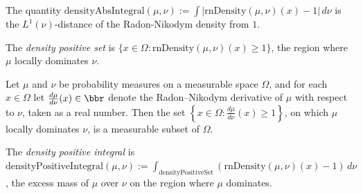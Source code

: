 \begin{definition}
\label{CommunicationComplexity.densityAbsIntegral}
\leanok
{}
The quantity $\mathrm{densityAbsIntegral}(\mu,\nu) := \int |\mathrm{rnDensity}(\mu,\nu)(x) - 1|\,d\nu$ is the $L^1(\nu)$-distance of the Radon-Nikodym density from $1$.
\end{definition}

\begin{definition}
\label{CommunicationComplexity.densityPositiveSet}
\leanok
{}
The \emph{density positive set} is $\{x \in \Omega : \mathrm{rnDensity}(\mu,\nu)(x) \ge 1\}$,
the region where $\mu$ locally dominates $\nu$.
\end{definition}

\begin{theorem}
\label{CommunicationComplexity.measurableSet_densityPositiveSet}
\leanok
{}
Let $\mu$ and $\nu$ be probability measures on a measurable space $\Omega$, and for each
$x \in \Omega$ let $\frac{d\mu}{d\nu}(x) \in \bbr$ denote the Radon–Nikodym derivative
of $\mu$ with respect to $\nu$, taken as a real number. Then the set $\left\{x \in
\Omega : \frac{d\mu}{d\nu}(x) \ge 1\right\}$, on which $\mu$ locally dominates $\nu$, is
a measurable subset of $\Omega$.
\end{theorem}

\begin{definition}
\label{CommunicationComplexity.densityPositiveIntegral}
\leanok
{}
The \emph{density positive integral} is
$\mathrm{densityPositiveIntegral}(\mu,\nu) := \int_{\mathrm{densityPositiveSet}} (\mathrm{rnDensity}(\mu,\nu)(x)-1)\,d\nu$,
the excess mass of $\mu$ over $\nu$ on the region where $\mu$ dominates.
\end{definition}

